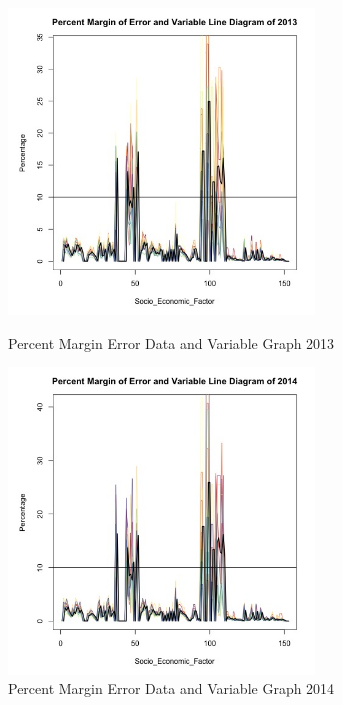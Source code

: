 \documentclass{mcmthesis}
\begin{document}
\begin{appendices}
\begin{figure}[H]
\centering
\begin{minipage}[t]{0.45\textwidth}
\centering
\includegraphics[width=3.2in]{figures/PercentMarginErrorDataGraphVariable2013.jpeg}
\caption{Percent Margin Error Data and Variable Graph 2013}
\label{Percent Margin Error Data and Variable Graph 2013}
\end{minipage}
\hfill
\begin{minipage}[t]{0.45\textwidth}
\centering
\includegraphics[width=3.2in]{figures/PercentMarginErrorDataGraphVariable2014.jpeg}
\caption{Percent Margin Error Data and Variable Graph 2014}
\label{Percent Margin Error Data and Variable Graph 2014}
\end{minipage}
\end{figure}


\end{appendices}
\end{document}

